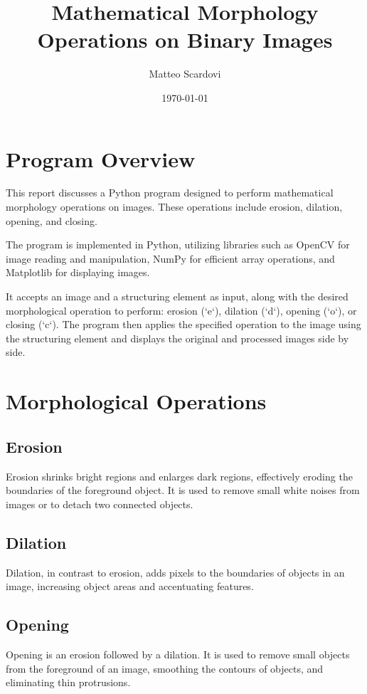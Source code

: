 \documentclass[12pt]{article}
\title{Mathematical Morphology Operations on Binary Images}
\author{Matteo Scardovi}
\date{\today}
\begin{document}
\maketitle

\section{Program Overview}
This report discusses a Python program designed to perform mathematical morphology operations on images. These operations include erosion, dilation, opening, and closing.

The program is implemented in Python, utilizing libraries such as OpenCV for image reading and manipulation, NumPy for efficient array operations, and Matplotlib for displaying images. 

It accepts an image and a structuring element as input, along with the desired morphological operation to perform: erosion (`e`), dilation (`d`), opening (`o`), or closing (`c`). The program then applies the specified operation to the image using the structuring element and displays the original and processed images side by side.

\section{Morphological Operations}
\subsection{Erosion}
Erosion shrinks bright regions and enlarges dark regions, effectively eroding the boundaries of the foreground object. It is used to remove small white noises from images or to detach two connected objects.

\subsection{Dilation}
Dilation, in contrast to erosion, adds pixels to the boundaries of objects in an image, increasing object areas and accentuating features.

\subsection{Opening}
Opening is an erosion followed by a dilation. It is used to remove small objects from the foreground of an image, smoothing the contours of objects, and eliminating thin protrusions.
\end{document}
